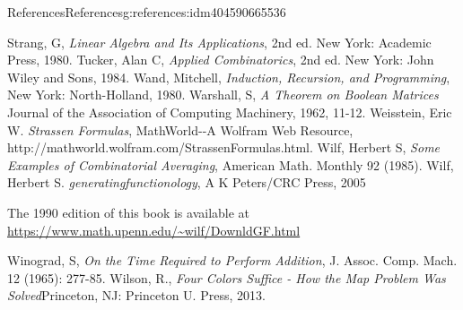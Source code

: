 \documentclass[twoside,10pt,]{book}
\newcommand{\xreffont}{\relax}
\numberwithin{equation}{section}
\begin{document}
\begin{references-chapter-numberless}{References}{}{References}{}{}{g:references:idm404590665536}
\begin{referencelist}
\label{x:biblio:biblio-strang-1980}{}\hypertarget{x:biblio:biblio-strang-1980}{}Strang, G, \textit{Linear Algebra and Its Applications}, 2nd ed. New York: Academic Press, 1980.
\label{x:biblio:biblio-tucker-1984}{}\hypertarget{x:biblio:biblio-tucker-1984}{}Tucker, Alan C, \textit{Applied Combinatorics}, 2nd ed. New York: John Wiley and Sons, 1984.
\label{x:biblio:biblio-wand-1980}{}\hypertarget{x:biblio:biblio-wand-1980}{}Wand, Mitchell, \textit{Induction, Recursion, and Programming}, New York: North-Holland, 1980.
\label{x:biblio:biblio-warshall-1962}{}\hypertarget{x:biblio:biblio-warshall-1962}{}Warshall, S, \textit{A Theorem on Boolean Matrices}  Journal of the Association of Computing Machinery, 1962, 11-12.
\label{x:biblio:biblio-weisstein-2010}{}\hypertarget{x:biblio:biblio-weisstein-2010}{}Weisstein, Eric W. \textit{Strassen Formulas},  MathWorld-{}-{}A Wolfram Web Resource, http:\slash{}\slash{}mathworld.wolfram.com\slash{}StrassenFormulas.html.
\label{x:biblio:biblio-wilf-1985}{}\hypertarget{x:biblio:biblio-wilf-1985}{}Wilf, Herbert S, \textit{Some Examples of Combinatorial Averaging}, American Math. Monthly 92 (1985).
\label{x:biblio:biblio-wilf-1990}{}\hypertarget{x:biblio:biblio-wilf-1990}{}Wilf, Herbert S. \textit{generatingfunctionology}, A K Peters\slash{}CRC Press, 2005\par%
The 1990 edition of this book is available at \href{https://www.math.upenn.edu/\~wilf/DownldGF.html}{https:\slash{}\slash{}www.math.upenn.edu\slash{}\textasciitilde{}wilf\slash{}DownldGF.html}%

\label{x:biblio:biblio-winograd-1965}{}\hypertarget{x:biblio:biblio-winograd-1965}{}Winograd, S, \textit{On the Time Required to Perform Addition}, J. Assoc. Comp. Mach. 12 (1965): 277-85.
\label{x:biblio:biblio-wilson-2013}{}\hypertarget{x:biblio:biblio-wilson-2013}{}Wilson, R., \textit{Four Colors Suffice - How the Map Problem Was Solved}Princeton, NJ: Princeton U. Press, 2013.
\end{referencelist}
\end{references-chapter-numberless}
%
{\xreffont\printindex}
%
\end{document}
